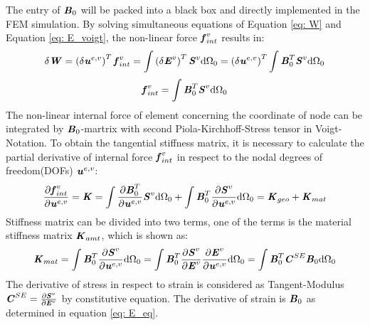 The entry of $\textbf{\textit{B}}_0$ will be packed into a black box and directly implemented in the FEM simulation. By solving simultaneous equations of Equation \ref{eq: W} and Equation \ref{eq: E_voigt}, the non-linear force $\textbf{\textit{f}}_{int}^v$ results in:
\begin{equation}
\delta \textbf{\textit{W}} = \left(\delta \textbf{\textit{u}}^{e,v}\right)^T \textbf{\textit{f}}_{int}^v = \int \left(\delta \textbf{\textit{E}}^v\right)^T \textbf{\textit{S}}^v \mathrm{d}\Omega_0 = \left( \delta \textbf{\textit{u}}^{e,v}\right)^T \int \textbf{\textit{B}}_0^T \textbf{\textit{S}}^v \mathrm{d}\Omega_0
\end{equation}
\begin{equation}
\textbf{\textit{f}}_{int}^v = \int \textbf{\textit{B}}_0^T \textbf{\textit{S}}^v \mathrm{d}\Omega_0
\end{equation}
The non-linear internal force of element concerning the coordinate of node can be integrated by $\textbf{\textit{B}}_0$-martrix with second Piola-Kirchhoff-Stress tensor in Voigt-Notation. To obtain the tangential stiffness matrix, it is necessary to calculate the partial derivative of internal force $\textbf{\textit{f}}_{int}^v$ in respect to the nodal degrees of freedom(DOFs) $\textbf{\textit{u}}^{e,v}$:
\begin{equation} \label{K}
\frac{\partial \textbf{\textit{f}}_{int}^v}{\partial \textbf{\textit{u}}^{e,v}} = \textbf{\textit{K}} = \int \frac{\partial \textbf{\textit{B}}_0^T}{\partial \textbf{\textit{u}}^{e,v}} \textbf{\textit{S}}^v \mathrm{d}\Omega_0 + \int \textbf{\textit{B}}_0^T \frac{\partial \textbf{\textit{S}}^v}{\partial \textbf{\textit{u}}^{e,v}} \mathrm{d}\Omega_0 = \textbf{\textit{K}}_{geo} + \textbf{\textit{K}}_{mat}
\end{equation}
Stiffness matrix can be divided into two terms, one of the terms is the material stiffness matrix $\textbf{\textit{K}}_{amt}$, which is shown as:
\begin{equation}
\textbf{\textit{K}}_{mat} = \int \textbf{\textit{B}}_0^T \frac{\partial \textbf{\textit{S}}^v}{\partial \textbf{\textit{u}}^{e,v}}\mathrm{d}\Omega_0 = \int \textbf{\textit{B}}_0^T\frac{\partial \textbf{\textit{S}}^v}{\partial \textbf{\textit{E}}^v} \frac{\partial \textbf{\textit{E}}^v}{\partial \textbf{\textit{u}}^{e,v}} \mathrm{d}\Omega_0 = \int \textbf{\textit{B}}_0^T \textbf{\textit{C}}^{SE} \textbf{\textit{B}}_0 \mathrm{d}\Omega_0
\end{equation}
The derivative of stress in respect to strain is considered as Tangent-Modulus $\textbf{\textit{C}}^{SE} = \frac{\partial \textbf{\textit{S}}^v}{\partial \textbf{\textit{E}}^v}$ by constitutive equation. The derivative of strain is $\textbf{\textit{B}}_0$ as determined in equation \ref{eq: E_eq}. \\
